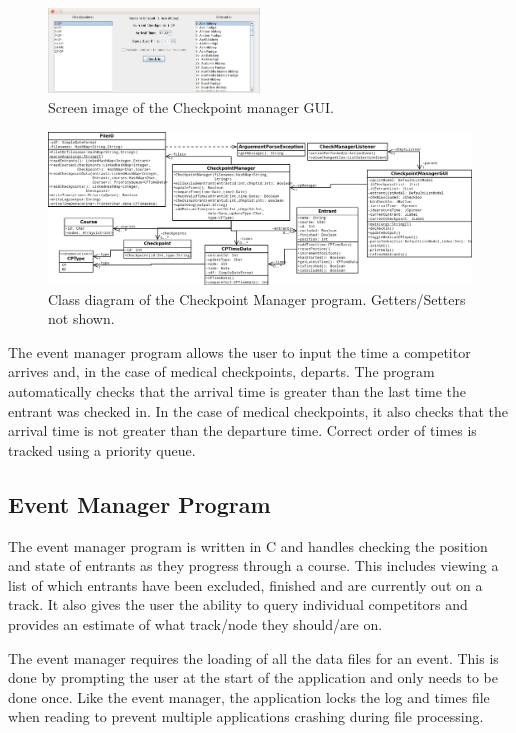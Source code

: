 \documentclass{article}
\begin{document}
\begin{figure}[H]
\centering
\includegraphics[width=0.5\textwidth]{img/GUI-screenshot.png}
\caption{Screen image of the Checkpoint manager GUI.}
\label{fig:GUI-image}
\end{figure}

\begin{figure}[H]
\centering
\includegraphics[width=1\textwidth]{diagrams/checkpoint_manager.png}
\caption{Class diagram of the Checkpoint Manager program. Getters/Setters not shown.}
\label{fig:GUI-image}
\end{figure}

The event manager program allows the user to input the time a competitor arrives and, in the case of medical checkpoints, departs. The program automatically checks that the arrival time is greater than the last time the entrant was checked in. In the case of medical checkpoints, it also checks that the arrival time is not greater than the departure time. Correct order of times is tracked using a priority queue.

\subsection{Event Manager Program}
The event manager program is written in C and handles checking the position and state of entrants as they progress through a course. This includes viewing a list of which entrants have been excluded, finished and are currently out on a track. It also gives the user the ability to query individual competitors and provides an estimate of what track/node they should/are on.

The event manager requires the loading of all the data files for an event. This is done by prompting the user at the start of the application and only needs to be done once. Like the event manager, the application locks the log and times file when reading to prevent multiple applications crashing during file processing.
\end{document}
